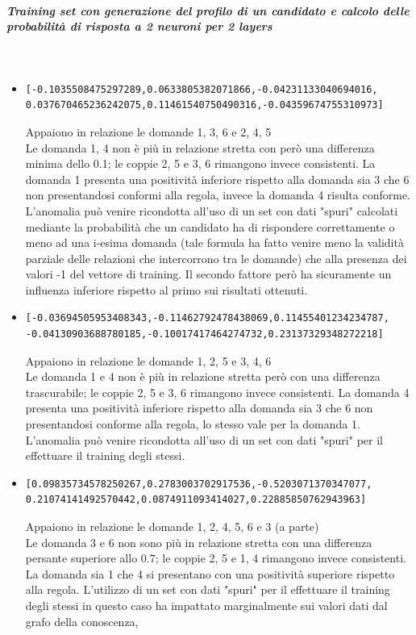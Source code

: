 \documentclass[10pt,a4paper]{article}
\begin{document}
\subparagraph{Training set con generazione del profilo di un candidato e calcolo delle probabilit\`a di risposta a  2 neuroni per 2 layers}\mbox{}
\label{Training set con generazione del profilo di un candidato e calcolo delle probabilita di risposta a  2 neuroni}
\\
\begin{itemize}
\item  \begin{verbatim}[-0.1035508475297289,0.0633805382071866,-0.04231133040694016,
0.037670465236242075,0.11461540750490316,-0.04359674755310973]\end{verbatim}
Appaiono in relazione le domande 1, 3, 6 e 2, 4, 5\\
Le domanda 1, 4 non \`e pi\`u in relazione stretta con per\`o una differenza minima dello 0.1; le coppie 2, 5 e 3, 6 rimangono invece consistenti. La domanda 1 presenta una positivit\`a inferiore rispetto alla domanda sia 3 che 6 non presentandosi conformi alla regola, invece la domanda 4 risulta conforme. L'anomalia pu\`o venire ricondotta all'uso di un set con dati "spuri" calcolati mediante la probabilit\`a che un candidato ha di rispondere correttamente o meno ad una i-esima domanda (tale formula ha fatto venire meno la validit\`a parziale delle relazioni che intercorrono tra le domande) che alla presenza dei valori -1 del vettore di training. Il secondo fattore per\`o ha sicuramente un influenza inferiore rispetto al primo sui risultati ottenuti.

\item  \begin{verbatim}[-0.03694505953408343,-0.11462792478438069,0.11455401234234787,
-0.04130903688780185,-0.10017417464274732,0.23137329348272218]\end{verbatim}
Appaiono in relazione le domande 1, 2, 5 e 3, 4, 6\\
Le domanda 1 e 4 non \`e pi\`u in relazione stretta per\`o con una differenza trascurabile; le coppie 2, 5 e 3, 6 rimangono invece consistenti. La domanda 4 presenta una positivit\`a inferiore rispetto alla domanda sia 3 che 6 non presentandosi conforme alla regola, lo stesso vale per la domanda 1. L'anomalia pu\`o venire ricondotta all'uso di un set con dati "spuri" per il effettuare il training degli stessi.

\item  \begin{verbatim}[0.09835734578250267,0.2783003702917536,-0.5203071370347077,
0.21074141492570442,0.0874911093414027,0.22885850762943963]\end{verbatim}
Appaiono in relazione le domande 1, 2, 4, 5, 6 e 3 (a parte)\\
Le domanda 3 e 6  non sono pi\`u in relazione stretta con una differenza persante superiore allo 0.7; le coppie 2, 5 e 1, 4 rimangono invece consistenti. La domanda sia 1 che 4 si presentano con una positivit\`a superiore rispetto alla regola. L'utilizzo di  un set con dati "spuri" per il effettuare il training degli stessi in questo caso ha impattato marginalmente sui valori dati dal grafo della conoscenza,


\end{itemize}
\end{document}
